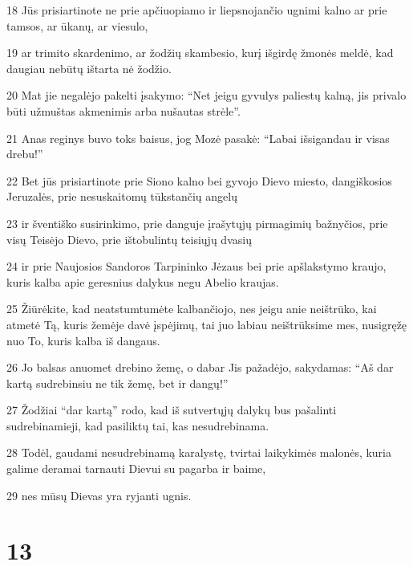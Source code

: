 \par 18 Jūs prisiartinote ne prie apčiuopiamo ir liepsnojančio ugnimi kalno ar prie tamsos, ar ūkanų, ar viesulo, 
\par 19 ar trimito skardenimo, ar žodžių skambesio, kurį išgirdę žmonės meldė, kad daugiau nebūtų ištarta nė žodžio. 
\par 20 Mat jie negalėjo pakelti įsakymo: “Net jeigu gyvulys paliestų kalną, jis privalo būti užmuštas akmenimis arba nušautas strėle”. 
\par 21 Anas reginys buvo toks baisus, jog Mozė pasakė: “Labai išsigandau ir visas drebu!” 
\par 22 Bet jūs prisiartinote prie Siono kalno bei gyvojo Dievo miesto, dangiškosios Jeruzalės, prie nesuskaitomų tūkstančių angelų 
\par 23 ir šventiško susirinkimo, prie danguje įrašytųjų pirmagimių bažnyčios, prie visų Teisėjo Dievo, prie ištobulintų teisiųjų dvasių 
\par 24 ir prie Naujosios Sandoros Tarpininko Jėzaus bei prie apšlakstymo kraujo, kuris kalba apie geresnius dalykus negu Abelio kraujas. 
\par 25 Žiūrėkite, kad neatstumtumėte kalbančiojo, nes jeigu anie neištrūko, kai atmetė Tą, kuris žemėje davė įspėjimų, tai juo labiau neištrūksime mes, nusigręžę nuo To, kuris kalba iš dangaus. 
\par 26 Jo balsas anuomet drebino žemę, o dabar Jis pažadėjo, sakydamas: “Aš dar kartą sudrebinsiu ne tik žemę, bet ir dangų!” 
\par 27 Žodžiai “dar kartą” rodo, kad iš sutvertųjų dalykų bus pašalinti sudrebinamieji, kad pasiliktų tai, kas nesudrebinama. 
\par 28 Todėl, gaudami nesudrebinamą karalystę, tvirtai laikykimės malonės, kuria galime deramai tarnauti Dievui su pagarba ir baime, 
\par 29 nes mūsų Dievas yra ryjanti ugnis.


\chapter{13}


